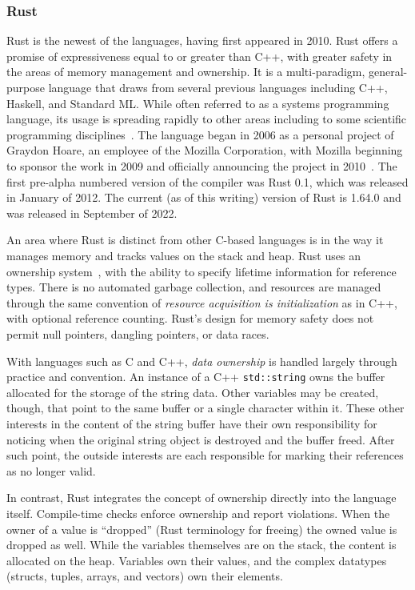 

\subsubsection{Rust}

Rust is the newest of the languages, having first appeared in 2010. Rust offers a promise of expressiveness equal to or greater than C++, with greater safety in the areas of memory management and ownership. It is a multi-paradigm, general-purpose language that draws from several previous languages including C++, Haskell, and Standard ML. While often referred to as a systems programming language, its usage is spreading rapidly to other areas including to some scientific programming disciplines~\cite{nature}. The language began in 2006 as a personal project of Graydon Hoare, an employee of the Mozilla Corporation, with Mozilla beginning to sponsor the work in 2009 and officially announcing the project in 2010~\cite{asay}. The first pre-alpha numbered version of the compiler was Rust 0.1, which was released in January of 2012. The current (as of this writing) version of Rust is 1.64.0 and was released in September of 2022.

An area where Rust is distinct from other C-based languages is in the way it manages memory and tracks values on the stack and heap. Rust uses an ownership system~\cite[Chapter~4]{programming}, with the ability to specify lifetime information for reference types. There is no automated garbage collection, and resources are managed through the same convention of \textit{resource acquisition is initialization} as in C++, with optional reference counting. Rust's design for memory safety does not permit null pointers, dangling pointers, or data races.

With languages such as C and C++, \textit{data ownership} is handled largely through practice and convention. An instance of a C++ \texttt{std::string} owns the buffer allocated for the storage of the string data. Other variables may be created, though, that point to the same buffer or a single character within it. These other interests in the content of the string buffer have their own responsibility for noticing when the original string object is destroyed and the buffer freed. After such point, the outside interests are each responsible for marking their references as no longer valid.

In contrast, Rust integrates the concept of ownership directly into the language itself. Compile-time checks enforce ownership and report violations. When the owner of a value is ``dropped'' (Rust terminology for freeing) the owned value is dropped as well. While the variables themselves are on the stack, the content is allocated on the heap. Variables own their values, and the complex datatypes (structs, tuples, arrays, and vectors) own their elements.


